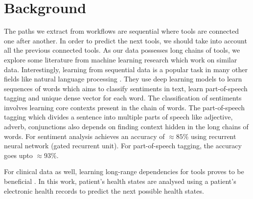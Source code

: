 \chapter{Background}\label{chap:previous_work_wf}

The paths we extract from workflows are sequential where tools are connected one after another. In order to predict the next tools, we should take into account all the previous connected tools. As our data possesses long chains of tools, we explore some literature from machine learning research which work on similar data. Interestingly, learning from sequential data is a popular task in many other fields like natural language processing \cite{0001KYS17, LiQYL16}. They use deep learning models to learn sequences of words which aims to classify sentiments in text, learn part-of-speech tagging and unique dense vector for each word. The classification of sentiments involves learning core contexts present in the chain of words. The part-of-speech tagging which divides a sentence into multiple parts of speech like adjective, adverb, conjunctions also depends on finding context hidden in the long chains of words. For sentiment analysis \cite{0001KYS17} achieves an accuracy of $\approx 85\%$ using recurrent neural network (gated recurrent unit). For part-of-speech tagging, the accuracy goes upto $\approx 93\%$. 


For clinical data as well, learning long-range dependencies for tools proves to be beneficial \cite{LiptonKEW15}. In this work, patient's health states are analysed using a patient's electronic health records to predict the next possible health states. 